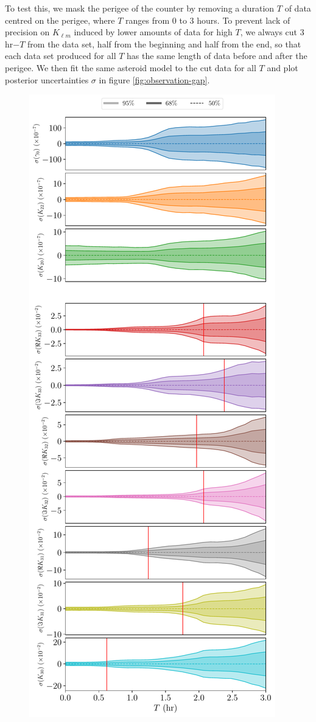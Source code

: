 \documentclass[fleqn,usenatbib]{mnras}
\begin{document}
To test this, we mask the perigee of the counter by removing a duration $T$ of data centred on the perigee, where $T$ ranges from 0 to 3 hours. To prevent lack of precision on $K_{\ell m}$ induced by lower amounts of data for high $T$, we always cut 3 hr$-T$ from the data set, half from the beginning and half from the end, so that each data set produced for all $T$ has the same length of data before and after the perigee. We then fit the same asteroid model to the cut data for all $T$ and plot posterior uncertainties $\sigma$ in figure \ref{fig:observation-gap}.

\begin{figure}
  \centering
  \includegraphics[height=0.89\textheight]{figs/observation-gap.pdf}

\end{figure}
\end{document}
